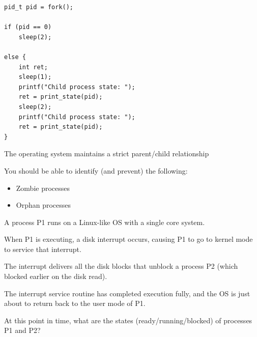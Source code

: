     \begin{slide}


        \vspace{-5mm}
        \begin{verbatim}
pid_t pid = fork();

if (pid == 0) 
    sleep(2);

else {
    int ret;
    sleep(1);
    printf("Child process state: ");
    ret = print_state(pid);
    sleep(2);
    printf("Child process state: ");
    ret = print_state(pid);
}
        \end{verbatim}

    \end{slide}

\begin{slide}


    The operating system maintains a strict parent/child relationship
    \medskip

    You should be able to identify (and prevent) the following:
    \begin{itemize}
        \item Zombie processes
        \item Orphan processes
    \end{itemize}
        
\end{slide}
   

\begin{slide}

    
    A process P1 runs on a Linux-like OS with a single core system.
    \medskip
    
    When P1 is executing, a disk interrupt occurs, causing P1 to go to kernel mode to service that interrupt. 
    \medskip
    
    The interrupt delivers all the disk blocks that unblock a process P2 (which blocked earlier on the disk read). 
    \medskip
    
    The interrupt service routine has completed execution fully, and the OS is just about to return back to the user mode of P1. 
    \medskip
    
    At this point in time, what are the states (ready/running/blocked) of processes P1 and P2?
    
\end{slide}


